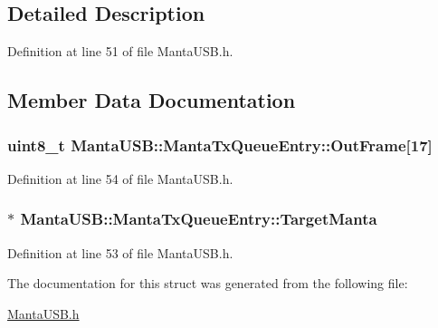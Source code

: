 \subsection{\-Detailed \-Description}


\-Definition at line 51 of file \-Manta\-U\-S\-B.\-h.



\subsection{\-Member \-Data \-Documentation}
\hypertarget{structMantaUSB_1_1MantaTxQueueEntry_acedefcae480fc665cd2d83c38b542edb}{
\subsubsection[{\-Out\-Frame}]{\setlength{\rightskip}{0pt plus 5cm}uint8\-\_\-t {\bf \-Manta\-U\-S\-B\-::\-Manta\-Tx\-Queue\-Entry\-::\-Out\-Frame}\mbox{[}17\mbox{]}}}\label{structMantaUSB_1_1MantaTxQueueEntry_acedefcae480fc665cd2d83c38b542edb}


\-Definition at line 54 of file \-Manta\-U\-S\-B.\-h.

\hypertarget{structMantaUSB_1_1MantaTxQueueEntry_ad4263c1f563d395ac02f91c6346217a2}{
\subsubsection[{\-Target\-Manta}]{$\ast$ {\bf \-Manta\-U\-S\-B\-::\-Manta\-Tx\-Queue\-Entry\-::\-Target\-Manta}}}\label{structMantaUSB_1_1MantaTxQueueEntry_ad4263c1f563d395ac02f91c6346217a2}


\-Definition at line 53 of file \-Manta\-U\-S\-B.\-h.



\-The documentation for this struct was generated from the following file\-:\begin{DoxyCompactItemize}
\item 
\hyperlink{MantaUSB_8h}{\-Manta\-U\-S\-B.\-h}\end{DoxyCompactItemize}
